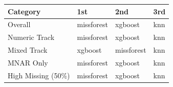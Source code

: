 \begin{tabular}{llll}
\toprule
Category & 1st & 2nd & 3rd \\
\midrule
Overall & missforest & xgboost & knn \\
Numeric Track & missforest & xgboost & knn \\
Mixed Track & xgboost & missforest & knn \\
MNAR Only & missforest & xgboost & knn \\
High Missing (50\%) & missforest & xgboost & knn \\
\bottomrule
\end{tabular}
